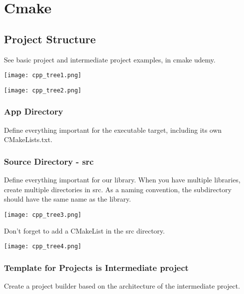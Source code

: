 \chapter{Cmake}

\section{Project Structure}

See basic project and intermediate project examples, in cmake udemy.


\begin{center}
    \texttt{[image: cpp\_tree1.png]}
\end{center}


\begin{center}
    \texttt{[image: cpp\_tree2.png]}
\end{center}

\subsection{App Directory}

Define everything important for the executable target, including its own CMakeLists.txt.

\subsection{Source Directory - src}

Define everything important for our library. When you have multiple libraries, create multiple directories in
src. As a naming convention, the subdirectory should have the same name as the library.

\begin{center}
    \texttt{[image: cpp\_tree3.png]}
\end{center}

Don't forget to add a CMakeList in the src directory.


\begin{center}
    \texttt{[image: cpp\_tree4.png]}
\end{center}


\subsection{Template for Projects is Intermediate project}

Create a project builder based on the architecture of the intermediate project.


